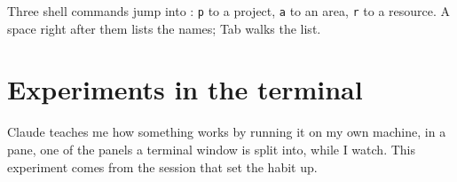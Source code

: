 \documentclass[11pt,a4paper]{article}
\begin{document}
Three shell commands jump into : \texttt{p} to a project, \texttt{a} to an area, \texttt{r} to a resource. A space right after them lists the names; Tab walks the list.


\section{Experiments in the terminal}

Claude teaches me how something works by running it on my own machine, in a  pane, one of the panels a terminal window is split into, while I watch. This experiment comes from the session that set the habit up.
\end{document}
